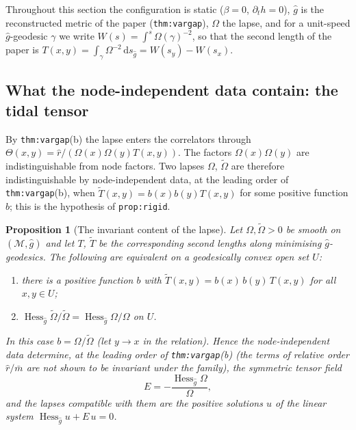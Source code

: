 \documentclass[a4paper,11pt]{article}
\newtheorem{proposition}[theorem]{Proposition}
\theoremstyle{definition}
\theoremstyle{remark}
\newcommand{\M}{\mathcal{M}}
\newcommand{\dd}{\mathrm{d}}
\begin{document}
Throughout this section the configuration is static ($\beta=0$, $\partial_th=0$), $\hat g$ is the reconstructed metric of the paper (\texttt{thm:vargap}), $\Omega$ the lapse, and for a unit-speed $\hat g$-geodesic $\gamma$ we write $W(s)=\int^s\Omega(\gamma)^{-2}$, so that the second length of the paper is $T(x,y)=\int_\gamma\Omega^{-2}\,\dd s_{\hat g}=W(s_y)-W(s_x)$.

\subsection{What the node-independent data contain: the tidal tensor}

By \texttt{thm:vargap}(b) the lapse enters the correlators through $\Theta(x,y)=\hat r/(\Omega(x)\Omega(y)T(x,y))$. The factors $\Omega(x)\Omega(y)$ are indistinguishable from node factors. Two lapses $\Omega$, $\tilde\Omega$ are therefore indistinguishable by node-independent data, at the leading order of \texttt{thm:vargap}(b), when $\tilde T(x,y)=b(x)b(y)T(x,y)$ for some positive function $b$; this is the hypothesis of \texttt{prop:rigid}.

\begin{proposition}[The invariant content of the lapse]\label{prop:tidal}
Let $\Omega,\tilde\Omega>0$ be smooth on $(\M,\hat g)$ and let $T$, $\tilde T$ be the corresponding second lengths along minimising $\hat g$-geodesics. The following are equivalent on a geodesically convex open set $U$:
\begin{enumerate}[label=\textup{(\roman*)}]
\item there is a positive function $b$ with $\tilde T(x,y)=b(x)\,b(y)\,T(x,y)$ for all $x,y\in U$;
\item $\operatorname{Hess}_{\hat g}\tilde\Omega/\tilde\Omega=\operatorname{Hess}_{\hat g}\Omega/\Omega$ on $U$.
\end{enumerate}
In this case $b=\Omega/\tilde\Omega$ (let $y\to x$ in the relation). Hence the node-independent data determine, at the leading order of \texttt{thm:vargap}(b) (the terms of relative order $\hat r/\bar m$ are not shown to be invariant under the family), the symmetric tensor field
\[
E=-\frac{\operatorname{Hess}_{\hat g}\Omega}{\Omega},
\]
and the lapses compatible with them are the positive solutions $u$ of the linear system $\operatorname{Hess}_{\hat g}u+E\,u=0$.
\end{proposition}
\end{document}
